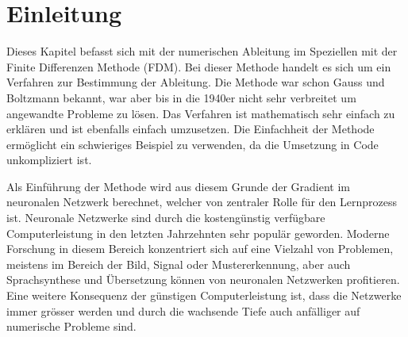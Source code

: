 %
%
%
\section{Einleitung\label{ableitung:section:einleitung}}
Dieses Kapitel befasst sich mit der numerischen Ableitung im Speziellen mit der Finite Differenzen Methode (FDM).
Bei dieser Methode handelt es sich um ein Verfahren zur Bestimmung der Ableitung. Die Methode war schon Gauss und Boltzmann bekannt, war aber bis in die 1940er nicht sehr verbreitet um angewandte Probleme zu lösen. Das Verfahren ist mathematisch sehr einfach zu erklären und ist ebenfalls einfach umzusetzen. Die Einfachheit der Methode ermöglicht ein schwieriges Beispiel zu verwenden, da die Umsetzung in Code unkompliziert ist.

Als Einführung der Methode wird aus diesem Grunde der Gradient im neuronalen Netzwerk berechnet, welcher von zentraler Rolle für den Lernprozess ist.
Neuronale Netzwerke sind durch die kostengünstig verfügbare Computerleistung in den letzten Jahrzehnten sehr populär geworden. Moderne Forschung in diesem Bereich konzentriert sich auf eine Vielzahl von Problemen, meistens im Bereich der Bild, Signal oder Mustererkennung, aber auch Sprachsynthese und Übersetzung können von neuronalen Netzwerken profitieren. Eine weitere Konsequenz der günstigen Computerleistung ist, dass die Netzwerke immer grösser werden und durch die wachsende Tiefe auch anfälliger auf numerische Probleme sind.
